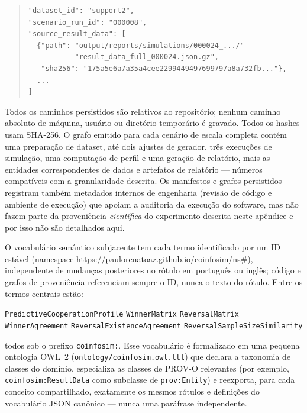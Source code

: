 \begin{quote}
\scriptsize
\begin{verbatim}
"dataset_id": "support2",
"scenario_run_id": "000008",
"source_result_data": [
  {"path": "output/reports/simulations/000024_.../"
           "result_data_full_000024.json.gz",
   "sha256": "175a5e6a7a35a4cee2299449497699797a8a732fb..."},
  ...
]
\end{verbatim}
\end{quote}

Todos os caminhos persistidos são relativos ao repositório; nenhum caminho absoluto de máquina, usuário ou diretório temporário é gravado. Todos os hashes usam SHA-256. O grafo emitido para cada cenário de escala completa contém uma preparação de dataset, até dois ajustes de gerador, três execuções de simulação, uma computação de perfil e uma geração de relatório, mais as entidades correspondentes de dados e artefatos de relatório --- números compatíveis com a granularidade descrita. Os manifestos e grafos persistidos registram também metadados internos de engenharia (revisão de código e ambiente de execução) que apoiam a auditoria da execução do software, mas não fazem parte da proveniência \emph{científica} do experimento descrita neste apêndice e por isso não são detalhados aqui.

O vocabulário semântico subjacente tem cada termo identificado por um ID estável (namespace \url{https://paulorenatoaz.github.io/coinfosim/ns#}), independente de mudanças posteriores no rótulo em português ou inglês; código e grafos de proveniência referenciam sempre o ID, nunca o texto do rótulo. Entre os termos centrais estão:

\begin{center}
\small
\texttt{PredictiveCooperationProfile} \textbullet{} \texttt{WinnerMatrix} \textbullet{} \texttt{ReversalMatrix} \textbullet{} \texttt{WinnerAgreement} \textbullet{} \texttt{ReversalExistenceAgreement} \textbullet{} \texttt{ReversalSampleSizeSimilarity}
\end{center}

\noindent todos sob o prefixo \texttt{coinfosim:}. Esse vocabulário é formalizado em uma pequena ontologia OWL~2 (\texttt{ontology/coinfosim.owl.ttl}) que declara a taxonomia de classes do domínio, especializa as classes de PROV-O relevantes (por exemplo, \texttt{coinfosim:ResultData} como subclasse de \texttt{prov:Entity}) e reexporta, para cada conceito compartilhado, exatamente os mesmos rótulos e definições do vocabulário JSON canônico --- nunca uma paráfrase independente.

